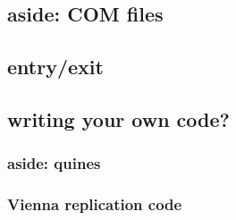 \subsection{aside: COM files}



\subsection{entry/exit}




\subsection{writing your own code?}

\subsubsection{aside: quines}




\subsubsection{Vienna replication code}






